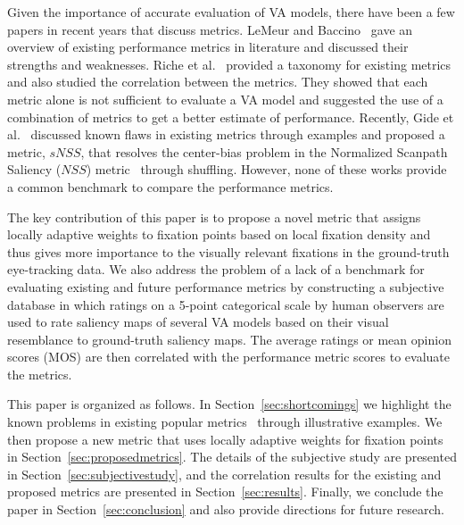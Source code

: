 \documentclass[12pt,onecolumn,journal,	draftclsnofoot]{IEEEtran}
\begin{document}
Given the importance of accurate evaluation of VA models, there have been a few papers in recent years that discuss metrics. LeMeur and Baccino~\cite{LeMeur2013} gave an overview of existing performance metrics in literature and discussed their strengths and weaknesses. Riche et al.~\cite{riche2013saliency} provided a taxonomy for existing metrics and also studied the correlation between the metrics. They showed that each metric alone is not sufficient to evaluate a VA model and suggested the use of a combination of metrics to get a better estimate of performance.  Recently, Gide et al.~\cite{MilindSamTPAMI} discussed known flaws in existing metrics  through examples and proposed a metric, $sNSS$, that resolves the center-bias problem in the Normalized Scanpath Saliency ($NSS$) metric~\cite{NSS} through shuffling.  However, none of these works provide a common benchmark to compare the performance metrics. 

The key contribution of this paper is to propose a novel metric that assigns locally adaptive weights to fixation points based on local fixation density and thus gives more importance to the visually relevant fixations in the ground-truth eye-tracking data.  We also address the problem of a lack of a benchmark for evaluating existing and future performance metrics by constructing a subjective database in which ratings on a 5-point categorical scale by human observers are used to rate saliency maps of several VA models based on their visual resemblance to ground-truth saliency maps. The average ratings or mean opinion scores (MOS) are then correlated with the performance metric scores to evaluate the metrics.

This paper is organized as follows. In Section~\ref{sec:shortcomings} we highlight the known problems in existing popular metrics~\cite{mit-saliency-benchmark} through illustrative examples.  We then propose a new metric that uses locally adaptive weights for fixation points  in  Section~\ref{sec:proposedmetrics}. The details of the subjective study are presented in Section~\ref{sec:subjectivestudy}, and the correlation results for the existing and proposed metrics are presented in Section~\ref{sec:results}. Finally, we conclude the paper in Section~\ref{sec:conclusion} and also provide directions for future research. 
\end{document}
